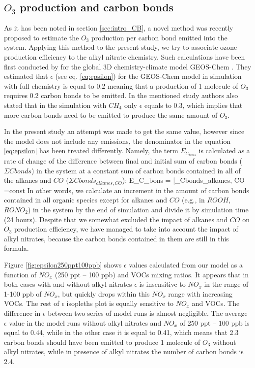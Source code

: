 \documentclass[11pt,a4paper]{article}
\newcounter{matriz}
\newenvironment{matriz}{\refstepcounter{matriz}\equation}{\tag{\thematriz}\endequation}
\begin{document}
\subsection{$O_3$ production and carbon bonds}\label{sec:res_O3ANCB}

As it has been noted in section \ref{sec:intro_CB}, a novel method was recently proposed to estimate the $O_3$ production per carbon bond emitted into the system. Applying this method to the present study, we try to associate ozone production efficiency to the alkyl nitrate chemistry. Such calculations have been first conducted by \cite{Evans2014} for the global 3D chemistry-climate model GEOS-Chem \citep{Bey2001}. They estimated that $\epsilon$ (see eq. \ref{eq:epsilon}) for the GEOS-Chem model in simulation with full chemistry is equal to 0.2 meaning that a production of 1 molecule of $O_3$ requires 0.2 carbon bonds to be emitted. In the mentioned study authors also stated that in the simulation with $CH_4$ only $\epsilon$ equals to 0.3, which implies that more carbon bonds need to be emitted to produce the same amount of $O_3$.

In the present study an attempt was made to get the same value, however since the model does not include any emissions, the denominator in the equation \ref{eq:epsilon} has been treated differently. Namely, the term $E_{C_{bons}}$ is calculated as a rate of change of the difference between final and initial sum of carbon bonds ($\Sigma Cbonds$) in the system at a constant sum of carbon bonds contained in all of the alkanes and $CO$ ($\Sigma Cbonds_{alkanes, CO}$): 
\begin{matriz}\label{eq:ECbonds}
E_{C_{bons}} = {}\bigg|_{\Sigma Cbonds_{alkanes, CO} =const}
\end{matriz}
In other words, we calculate an increment in the amount of carbon bonds contained in all organic species except for alkanes and $CO$ (e.g., in $ROOH$, $RONO_2$) in the system by the end of simulation and divide it by simulation time (24 hours). Despite that we somewhat excluded the impact of alkanes and $CO$ on $O_3$ production efficiency, we have managed to take into account the impact of alkyl nitrates, because the carbon bonds contained in them are still in this formula.

Figure \ref{fig:epsilon250ppt100ppb} shows $\epsilon$ values calculated from our model as a function of $NO_x$ (250 ppt -- 100 ppb) and VOCs mixing ratios. It appears that in both cases with and without alkyl nitrates $\epsilon$ is insensitive to $NO_x$ in the range of 1-100 ppb of $NO_x$, but quickly drops within this $NO_x$ range with increasing VOCs. The rest of $\epsilon$ isopleths plot is equally sensitive to $NO_x$ and VOCs. The difference in $\epsilon$ between two series of model runs is almost negligible. The average $\epsilon$ value in the model runs without alkyl nitrates and $NO_x$ of 250 ppt -- 100 ppb is equal to 0.44, while in the other case it is equal to 0.41, which means that 2.3 carbon bonds should have been emitted to produce 1 molecule of $O_3$ without alkyl nitrates, while in presence of alkyl nitrates the number of carbon bonds is 2.4.
\end{document}
